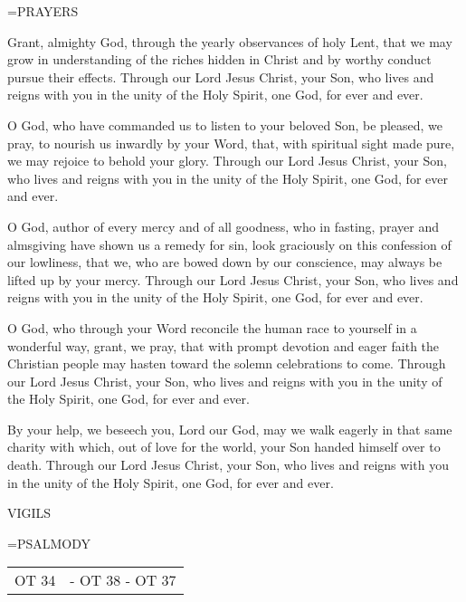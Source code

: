 \hangindent=\parindent \small PRAYERS
\begin{description}[labelindent=\parindent, leftmargin=*]
\item [Week 1:] 	Grant, almighty God, through the yearly observances of holy Lent, that we may grow in understanding of the riches hidden in Christ and by worthy conduct pursue their effects. Through our Lord Jesus Christ, your Son, who lives and reigns with you in the unity of the Holy Spirit, one God, for ever and ever.
\item [Week 2:] 	O God, who have commanded us to listen to your beloved Son, be pleased, we pray, to nourish us inwardly by your Word, that, with spiritual sight made pure, we may rejoice to behold your glory. Through our Lord Jesus Christ, your Son, who lives and reigns with you in the unity of the Holy Spirit, one God, for ever and ever.
\item [Week 3:] 	O God, author of every mercy and of all goodness, who in fasting, prayer and almsgiving have shown us a remedy for sin, look graciously on this confession of our lowliness, that we, who are bowed down by our conscience, may always be lifted up by your mercy. Through our Lord Jesus Christ, your Son, who lives and reigns with you in the unity of the Holy Spirit, one God, for ever and ever.
\item [Week 4:] 	O God, who through your Word reconcile the human race to yourself in a wonderful way, grant, we pray, that with prompt devotion and eager faith the Christian people may hasten toward the solemn celebrations to come. Through our Lord Jesus Christ, your Son, who lives and reigns with you in the unity of the Holy Spirit, one God, for ever and ever.
\item [Week 5:] 	By your help, we beseech you, Lord our God, may we walk eagerly in that same charity with which, out of love for the world, your Son handed himself over to death. Through our Lord Jesus Christ, your Son, who lives and reigns with you in the unity of the Holy Spirit, one God, for ever and ever.
\end{description}

\begin{flushleft}\normalsize VIGILS\\\end{flushleft}
\hangindent=\parindent \small{PSALMODY}
\begin{center}
\begin{tabular}{ l l }
OT 34 &  - OT 38 - OT 37\\
\end{tabular}
\end{center}		

